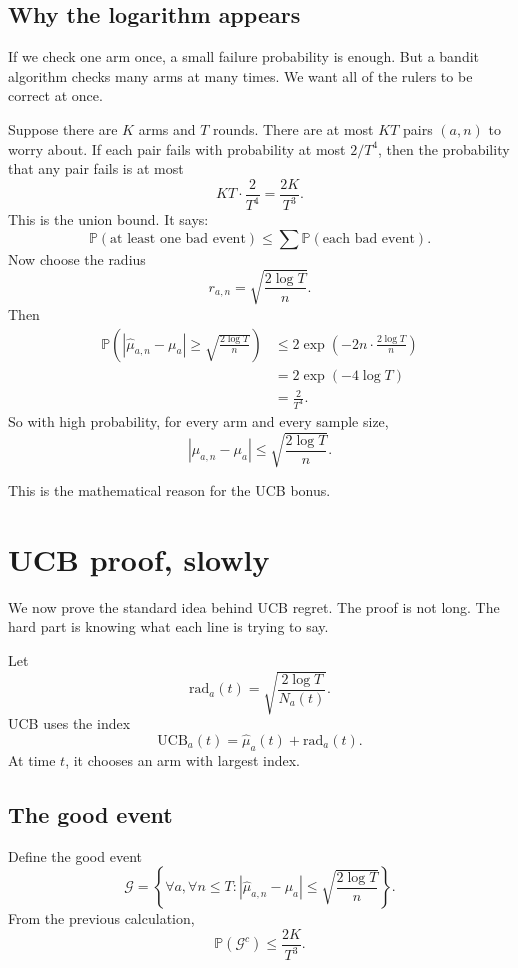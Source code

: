 \documentclass[en,nofont,11pt]{elegantbook}
\newcommand{\Prob}{\mathbb{P}}
\begin{document}
\section{Why the logarithm appears}

If we check one arm once, a small failure probability is enough.  But a bandit algorithm checks many arms at many times.  We want all of the rulers to be correct at once.

Suppose there are $K$ arms and $T$ rounds.  There are at most $KT$ pairs $(a,n)$ to worry about.  If each pair fails with probability at most $2/T^4$, then the probability that any pair fails is at most
\[
KT\cdot \frac{2}{T^4}
=
\frac{2K}{T^3}.
\]
This is the union bound.  It says:
\[
\Prob(\text{at least one bad event})
\le
\sum \Prob(\text{each bad event}).
\]
Now choose the radius
\[
r_{a,n}
=
\sqrt{\frac{2\log T}{n}}.
\]
Then
\[
\begin{aligned}
\Prob\left(
\left|\widehat{\mu}_{a,n}-\mu_a\right|
\ge
\sqrt{\frac{2\log T}{n}}
\right)
&\le
2\exp\left(
-2n\cdot \frac{2\log T}{n}
\right)\\
&=
2\exp(-4\log T)\\
&=
\frac{2}{T^4}.
\end{aligned}
\]
So with high probability, for every arm and every sample size,
\[
\left|\widehat{\mu}_{a,n}-\mu_a\right|
\le
\sqrt{\frac{2\log T}{n}}.
\]

This is the mathematical reason for the UCB bonus.

\chapter{UCB proof, slowly}

We now prove the standard idea behind UCB regret.  The proof is not long.  The hard part is knowing what each line is trying to say.

Let
\[
\mathrm{rad}_{a}(t)
=
\sqrt{\frac{2\log T}{N_a(t)}}.
\]
UCB uses the index
\[
\mathrm{UCB}_a(t)
=
\widehat{\mu}_a(t)+\mathrm{rad}_a(t).
\]
At time $t$, it chooses an arm with largest index.

\section{The good event}

Define the good event
\[
\mathcal{G}
=
\left\{
\forall a,\forall n\le T:
\left|\widehat{\mu}_{a,n}-\mu_a\right|
\le
\sqrt{\frac{2\log T}{n}}
\right\}.
\]
From the previous calculation,
\[
\Prob(\mathcal{G}^c)\le \frac{2K}{T^3}.
\]
\end{document}
